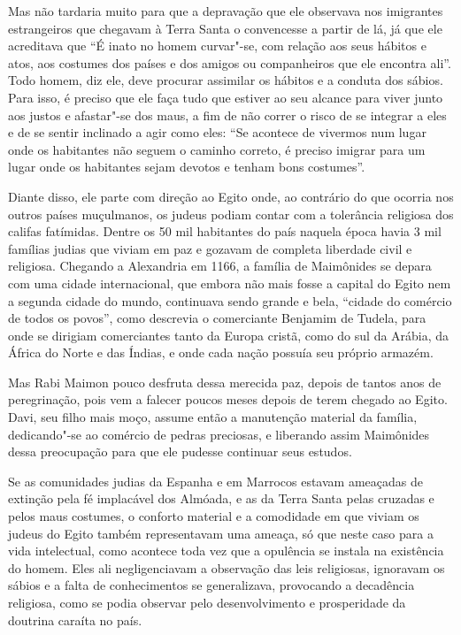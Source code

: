 Mas não tardaria muito para que a depravação que ele observava nos
imigrantes estrangeiros que chegavam à Terra Santa o convencesse a
partir de lá, já que ele acreditava que ``É inato no homem curvar"-se,
com relação aos seus hábitos e atos, aos costumes dos países e dos
amigos ou companheiros que ele encontra ali''. Todo homem, diz ele, deve
procurar assimilar os hábitos e a conduta dos sábios. Para isso, é
preciso que ele faça tudo que estiver ao seu alcance para viver junto
aos justos e afastar"-se dos maus, a fim de não correr o risco de se
integrar a eles e de se sentir inclinado a agir como eles: ``Se acontece
de vivermos num lugar onde os habitantes não seguem o caminho correto, é
preciso imigrar para um lugar onde os habitantes sejam devotos e tenham
bons costumes''.

Diante disso, ele parte com direção ao Egito onde, ao contrário do que
ocorria nos outros países muçulmanos, os judeus podiam contar com a
tolerância religiosa dos califas fatímidas. Dentre os 50 mil habitantes
do país naquela época havia 3 mil famílias judias que viviam em paz e
gozavam de completa liberdade civil e religiosa. Chegando a Alexandria
em 1166, a família de Maimônides se depara com uma cidade internacional,
que embora não mais fosse a capital do Egito nem a segunda cidade do
mundo, continuava sendo grande e bela, ``cidade do comércio de todos os
povos'', como descrevia o comerciante Benjamim de Tudela, para onde se
dirigiam comerciantes tanto da Europa cristã, como do sul da Arábia, da
África do Norte e das Índias, e onde cada nação possuía seu próprio
armazém.

Mas Rabi Maimon pouco desfruta dessa merecida paz, depois de tantos
anos de peregrinação, pois vem a falecer poucos meses depois de terem
chegado ao Egito. Davi, seu filho mais moço, assume então a manutenção
material da família, dedicando"-se ao comércio de pedras preciosas, e
liberando assim Maimônides dessa preocupação para que ele pudesse
continuar seus estudos.

Se as comunidades judias da Espanha e em Marrocos estavam ameaçadas de
extinção pela fé implacável dos Almóada, e as da Terra Santa pelas
cruzadas e pelos maus costumes, o conforto material e a comodidade em
que viviam os judeus do Egito também representavam uma ameaça, só que
neste caso para a vida intelectual, como acontece toda vez que a
opulência se instala na existência do homem. Eles ali negligenciavam a
observação das leis religiosas, ignoravam os sábios e a falta de
conhecimentos se generalizava, provocando a decadência religiosa, como
se podia observar pelo desenvolvimento e prosperidade da doutrina
caraíta no país.

